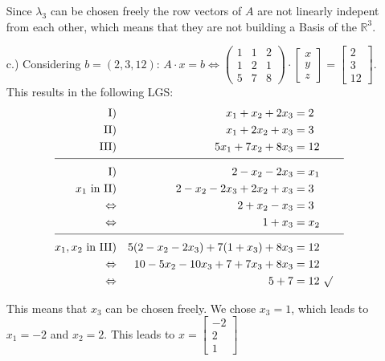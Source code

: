 \documentclass[%
   10pt,              %
   a4paper,           %
   DIV10,             %
]{scrartcl}%
\begin{document}
\begin{itemize}
	Since $\lambda_3$ can be chosen freely the row vectors of $A$ are not linearly indepent from each other, which means that they are not building a Basis of the $\mathbb{R}^3$.\newline
	
	\item[c.)] Considering $b = (2, 3, 12)$:\newline\noindent
	$A \cdot x = b \Leftrightarrow \begin{pmatrix}
	1 & 1 & 2\\
	1 & 2 & 1\\
	5 & 7 & 8
	\end{pmatrix} \cdot \begin{bmatrix}
	x\\
	y\\
	z
	\end{bmatrix} = \begin{bmatrix}
	2\\
	3\\
	12
	\end{bmatrix}$. This results in the following LGS:\newline\noindent
	\begin{align*}
	\text{I)} && x_1 + x_2 + 2x_3 &= 2 &&\\
	\text{II)} && x_1 + 2x_2 + x_3 &= 3 &&\\
	\text{III)} && 5x_1 + 7x_2 + 8x_3 &= 12 &&\\[-1.7ex]
	\cline{1-6}
	\text{I)} && 2 - x_2 - 2x_3 &=x_1 &&\\
	\text{$x_1$ in II)} && 2 - x_2 - 2x_3 + 2x_2 + x_3 &= 3\\
	\text{$\Leftrightarrow$} && 2 + x_2 - x_3  &= 3\\
	\text{$\Leftrightarrow$} && 1 + x_3 &= x_2&&\\[-1.7ex]
	\cline{1-6}
	\text{$x_1, x_2$ in III)} &&  5(2 - x_2 - 2x_3) + 7(1 + x_3) + 8x_3 &= 12\\
	\text{$\Leftrightarrow$} && 10 - 5x_2 - 10x_3 + 7 + 7x_3 + 8x_3 &=12\\
	\text{$\Leftrightarrow$} && 5 + 7&= 12~\surd\\
	\end{align*}
	
	This means that $x_3$ can be chosen freely. We chose $x_3 = 1$, which leads to $x_1 = -2$ and $x_2 = 2$. This leads to $x = \begin{bmatrix}
	-2\\
	2\\
	1
	\end{bmatrix}$
	

\end{itemize}
\end{document}
